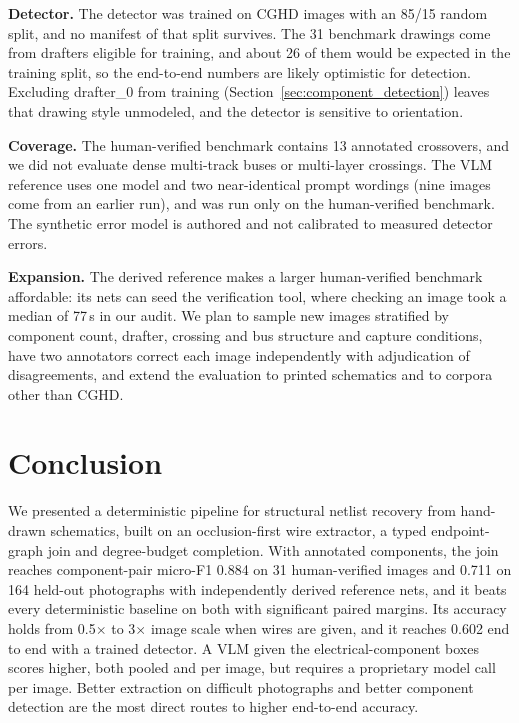 \documentclass[journal]{IEEEtran}
\begin{document}
\textbf{Detector.} The detector was trained on CGHD images with an 85/15 random split, and no manifest of that split survives. The 31 benchmark drawings come from drafters eligible for training, and about 26 of them would be expected in the training split, so the end-to-end numbers are likely optimistic for detection. Excluding drafter\_0 from training (Section~\ref{sec:component_detection}) leaves that drawing style unmodeled, and the detector is sensitive to orientation.

\textbf{Coverage.} The human-verified benchmark contains 13 annotated crossovers, and we did not evaluate dense multi-track buses or multi-layer crossings. The VLM reference uses one model and two near-identical prompt wordings (nine images come from an earlier run), and was run only on the human-verified benchmark. The synthetic error model is authored and not calibrated to measured detector errors.

\textbf{Expansion.} The derived reference makes a larger human-verified benchmark affordable: its nets can seed the verification tool, where checking an image took a median of 77\,s in our audit. We plan to sample new images stratified by component count, drafter, crossing and bus structure and capture conditions, have two annotators correct each image independently with adjudication of disagreements, and extend the evaluation to printed schematics and to corpora other than CGHD.

\section{Conclusion}

We presented a deterministic pipeline for structural netlist recovery from hand-drawn schematics, built on an occlusion-first wire extractor, a typed endpoint-graph join and degree-budget completion. With annotated components, the join reaches component-pair micro-F1 0.884 on 31 human-verified images and 0.711 on 164 held-out photographs with independently derived reference nets, and it beats every deterministic baseline on both with significant paired margins. Its accuracy holds from 0.5$\times$ to 3$\times$ image scale when wires are given, and it reaches 0.602 end to end with a trained detector. A VLM given the electrical-component boxes scores higher, both pooled and per image, but requires a proprietary model call per image. Better extraction on difficult photographs and better component detection are the most direct routes to higher end-to-end accuracy.
\end{document}
